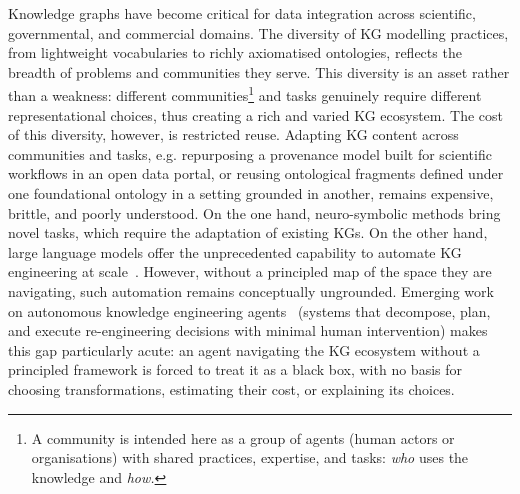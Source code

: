\documentclass[runningheads]{llncs}
\newenvironment{onlyextended}{\ignorespaces}{\ignorespacesafterend}
\newenvironment{inboth}{}{}
\begin{document}
\begin{inboth}
Knowledge graphs have become critical for data integration across scientific, governmental, and commercial domains. 
The diversity of KG modelling practices, from lightweight vocabularies to richly axiomatised ontologies, reflects the breadth of problems and communities they serve.
This diversity is an asset rather than a weakness: different communities\footnote{A community is intended here as a group of agents (human actors or organisations) with shared practices, expertise, and tasks: \emph{who} uses the knowledge and \emph{how.}} and tasks genuinely require different representational choices, thus creating a rich and varied KG ecosystem. 
The cost of this diversity, however, is restricted reuse. 
Adapting KG content across communities and tasks, e.g. repurposing a provenance model built for scientific workflows in an open data portal, or reusing ontological fragments defined under one foundational ontology in a setting grounded in another, remains expensive, brittle, and poorly understood.
On the one hand, neuro-symbolic methods bring novel tasks, which require the adaptation of existing KGs.
On the other hand, large language models offer the unprecedented capability to automate KG engineering at scale~\cite{garijo2024llms}. 
However, without a principled map of the space they are navigating, such automation remains conceptually ungrounded. 
\end{inboth}
\begin{onlyextended}
Emerging work on autonomous knowledge engineering agents~\cite{garijo2024llms} (systems that decompose, plan, and execute re-engineering decisions with minimal human intervention) makes this gap particularly acute: an agent navigating the KG ecosystem without a principled framework is forced to treat it as a black box, with no basis for choosing transformations, estimating their cost, or explaining its choices.
\end{onlyextended}
\end{document}
